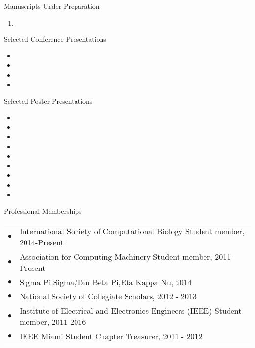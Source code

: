\documentclass{resume} %
\begin{document}
\begin{rSection}{Manuscripts Under Preparation}
  \begin{enumerate}
  \item {}
  \end{enumerate}
\end{rSection}
\begin{rSection}{Selected Conference Presentations}
  \begin{itemize}
    \item {}
    \item {}
    \item {}
    \item {}
  \end{itemize}
\end{rSection}
\begin{rSection}{Selected Poster Presentations}
  \begin{itemize}
    \setlength\itemsep{0em}
    \item {}
    \item {}
    \item {}
    \item {}
    \item {}
    \item {}
    \item {}
    \item {}
    \item {}
  \end{itemize}
\end{rSection}

\begin{rSection}{Professional Memberships}
  \begin{tabular}{ll}
    $\bullet$ & International Society of Computational Biology Student member, 2014-Present\\
    $\bullet$ & Association for Computing Machinery Student member, 2011-Present \\
    $\bullet$ & Sigma Pi Sigma,Tau Beta Pi,Eta Kappa Nu, 2014 \\
    $\bullet$ & National Society of Collegiate Scholars, 2012 - 2013\\
    $\bullet$ & Institute of Electrical and Electronics Engineers (IEEE) Student member, 2011-2016 \\
    $\bullet$ & IEEE Miami Student Chapter Treasurer, 2011 - 2012\\
  \end{tabular}
\end{rSection}
\end{document}
